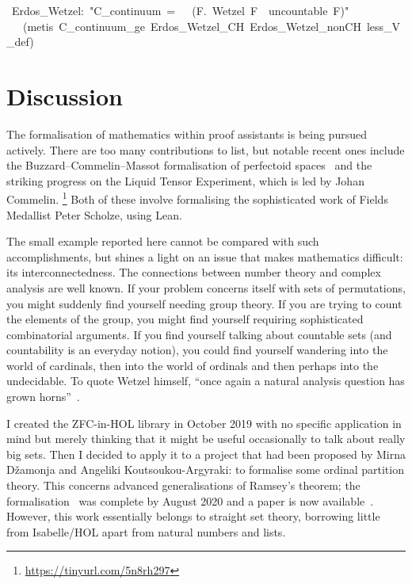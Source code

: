 \documentclass[runningheads]{llncs}
\begin{document}
\begin{isabelle}
\ Erdos\_Wetzel:\ "C\_continuum\ =\ \ \isasymlongleftrightarrow \ (\isasymexists F.\ Wetzel\ F\ \isasymand \ uncountable\ F)"\isanewline
\ \ \ (metis\ C\_continuum\_ge\ Erdos\_Wetzel\_CH\ Erdos\_Wetzel\_nonCH\ less\_V\_def)
\end{isabelle}


\section{Discussion}

The formalisation of mathematics within proof assistants is being pursued actively. There are too many contributions to list, but notable recent ones include the Buzzard--Commelin--Massot formalisation of perfectoid spaces~\cite{buzzard-perfectoid} and the striking progress on the Liquid Tensor Experiment, which is led by Johan Commelin.%
\footnote{\url{https://tinyurl.com/5n8rh297}}
Both of these involve formalising the sophisticated work of Fields Medallist Peter Scholze, using Lean.

The small example reported here cannot be compared with such accomplishments, but shines a light on an issue that makes mathematics difficult: its interconnectedness. The connections between number theory and complex analysis are well known. If your problem concerns itself with sets of permutations, you might suddenly find yourself needing group theory. If you are trying to count the elements of the group, you might find yourself requiring sophisticated combinatorial arguments. If you find yourself talking about countable sets (and countability is an everyday notion), you could find yourself wandering into the world of cardinals, then into the world of ordinals and then perhaps into the undecidable. To quote Wetzel himself, ``once again a natural analysis question has grown horns''~\cite[p.]{garcia-wetzels-problem}.

I created the ZFC-in-HOL library in October 2019 with no specific application in mind but merely thinking that it might be useful occasionally to talk about really big sets.
Then I decided to apply it to a project that had been proposed by Mirna Džamonja and Angeliki Koutsoukou-Argyraki: to formalise some ordinal partition theory. This concerns advanced generalisations of Ramsey's theorem; the formalisation~\cite{Ordinal_Partitions-AFP} was complete by August 2020 and a paper is now available~\cite{dzamonja-formalising}.
However, this work essentially belongs to straight set theory, borrowing little from Isabelle/HOL apart from natural numbers and lists.
\end{document}
